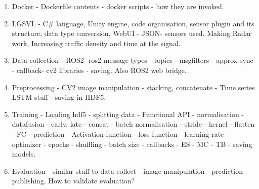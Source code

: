 \begin{enumerate}
    \item Docker - Dockerfile contents - docker scripts - how they are invoked.
    \item LGSVL - C\# language, Unity engine, code organisation, sensor plugin and its
        structure, data type conversion, WebUI - JSON- sensors used. Making Radar work,
        Increasing traffic density and time at the signal.
    \item Data collection - ROS2- ros2 message types - topics - msgfilters -
        approx-sync - callback- cv2 libraries - saving. Also ROS2 web bridge.
    \item Preprocessing - CV2 image manipulation - stacking, concatenate  -
        Time series LSTM stuff - saving in HDF5.
    \item Training - Loading hdf5 - splitting data - Functional API - normalisation
        - datafusion - early, late - concat - batch normalisation - stride - kernel -
        flatten - FC - prediction - Activation function - loss function - learning rate -
        optimizer - epochs - shuffling - batch size - callbacks - ES - MC - TB - saving
        models.
    \item Evaluation - similar stuff to data collect - image manipulation - prediction -
        publishing. How to validate evaluation?

\end{enumerate}

\fi
